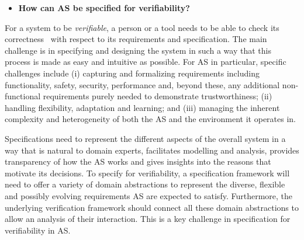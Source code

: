 \documentclass[sigconf,nonacm]{acmart}%
\begin{document}
	\begin{itemize}[leftmargin=0.5cm]
		\item \textbf{How can AS be specified for verifiability?}
	\end{itemize}
	For a system to be {\em verifiable\/}, a person or a tool needs to be able to check its correctness~\cite{ISO24765:2017} with respect to its requirements and specification. 
	The main challenge is in specifying and designing the system in such a way that this process is made as easy and intuitive as possible.
	For AS in particular, specific challenges include 
	(i) capturing and formalizing requirements including functionality, safety, security, performance and, beyond these, any additional non-functional requirements purely needed to demonstrate trustworthiness; 
	(ii) handling flexibility, adaptation and learning; and 
	(iii) managing the inherent complexity and heterogeneity of both the AS and the environment it operates in. 
	
	Specifications need to represent the different aspects of the overall system in a way that is natural to domain experts, facilitates modelling and analysis, provides transparency of how the AS works and gives insights into the reasons that motivate its decisions. 
	To specify for verifiability, a specification framework will need to offer a variety of domain abstractions to represent the diverse, flexible and possibly evolving requirements AS are expected to satisfy. 
	Furthermore, the underlying verification framework should connect all these domain abstractions to allow an analysis of their interaction. This is a key challenge in specification for verifiability in AS.
	
\end{document}
